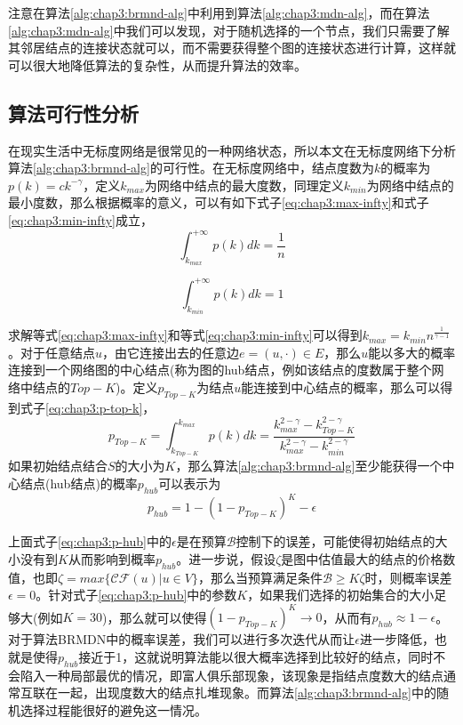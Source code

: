 注意在算法\ref{alg:chap3:brmnd-alg}中利用到算法\ref{alg:chap3:mdn-alg}，而在算法\ref{alg:chap3:mdn-alg}中我们可以发现，对于随机选择的一个节点，我们只需要了解其邻居结点的连接状态就可以，而不需要获得整个图的连接状态进行计算，这样就可以很大地降低算法的复杂性，从而提升算法的效率。


\subsection{算法可行性分析}
\label{sec:chap3:feasibility-analysis}
在现实生活中无标度网络是很常见的一种网络状态，所以本文在无标度网络下分析算法\ref{alg:chap3:brmnd-alg}的可行性。在无标度网络中，结点度数为$k$的概率为$p(k)=ck^{-\gamma}$，定义$k_{max}$为网络中结点的最大度数，同理定义$k_{min}$为网络中结点的最小度数，那么根据概率的意义，可以有如下式子\ref{eq:chap3:max-infty}和式子\ref{eq:chap3:min-infty}成立，
\begin{equation}
\label{eq:chap3:max-infty}
\int_{k_{max}}^{+\infty}p(k) dk = \frac{1}{n}
\end{equation}

\begin{equation}
\label{eq:chap3:min-infty}
\int_{k_{min}}^{+\infty}p(k) dk = 1
\end{equation}

求解等式\ref{eq:chap3:max-infty}和等式\ref{eq:chap3:min-infty}可以得到$k_{max} = k_{min}n^{\frac{1}{\gamma-1}}$。对于任意结点$u$，由它连接出去的任意边$e=(u, \cdot) \in E$，那么$u$能以多大的概率连接到一个网络图的中心结点(称为图的hub结点，例如该结点的度数属于整个网络中结点的$Top-K$)。定义$p_{Top-K}$为结点$u$能连接到中心结点的概率，那么可以得到式子\ref{eq:chap3:p-top-k}，
\begin{equation}
\label{eq:chap3:p-top-k}
p_{Top-K} = \int_{k_{Top-K}}^{k_{max}}p(k)dk = \frac{k_{max}^{2-\gamma} - k_{Top-K}^{2-\gamma}}{k_{max}^{2-\gamma} - k_{min}^{2-\gamma}}
\end{equation}
如果初始结点结合$S$的大小为$K$，那么算法\ref{alg:chap3:brmnd-alg}至少能获得一个中心结点(hub结点)的概率$p_{hub}$可以表示为
\begin{equation}
\label{eq:chap3:p-hub}
p_{hub} = 1 - (1-p_{Top-K})^{K} - \epsilon
\end{equation}


上面式子\ref{eq:chap3:p-hub}中的$\epsilon$是在预算$\mathcal{B}$控制下的误差，可能使得初始结点的大小没有到$K$从而影响到概率$p_{hub}$。进一步说，假设$\zeta$是图中估值最大的结点的价格数值，也即$\zeta = max \{\mathcal{CF}(u) | u \in V\}$，那么当预算满足条件$\mathcal{B} \geq K\zeta$时，则概率误差$\epsilon = 0$。针对式子\ref{eq:chap3:p-hub}中的参数$K$，如果我们选择的初始集合的大小足够大(例如$K=30$)，那么就可以使得$(1-p_{Top-K})^{K} \rightarrow 0$，从而有$p_{hub} \approx 1 - \epsilon$。对于算法BRMDN中的概率误差，我们可以进行多次迭代从而让$\epsilon$进一步降低，也就是使得$p_{hub}$接近于1，这就说明算法能以很大概率选择到比较好的结点，同时不会陷入一种局部最优的情况，即富人俱乐部现象\cite{zhou2004rich}，该现象是指结点度数大的结点通常互联在一起，出现度数大的结点扎堆现象。而算法\ref{alg:chap3:brmnd-alg}中的随机选择过程能很好的避免这一情况。


